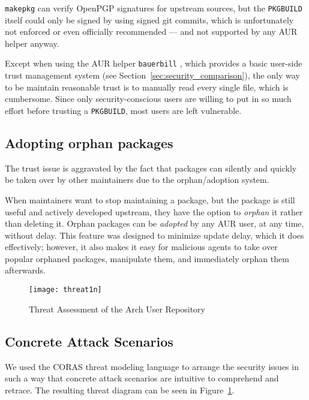 \texttt{makepkg} can verify OpenPGP signatures for upstream sources, but the \texttt{PKGBUILD} itself could only be signed by using signed git commits, which is unfortunately not enforced or even officially recommended --- and not supported by any AUR helper anyway.

Except when using the AUR helper \texttt{bauerbill} \cite{bauerbill}, which provides a basic user-side trust management system (see Section~\ref{sec:security_comparison}), the only way to be maintain reasonable trust is to manually read every single file, which is cumbersome.
Since only security-conscious users are willing to put in so much effort before trusting a \texttt{PKGBUILD}, most users are left vulnerable.

\subsection{Adopting orphan packages}
The trust issue is aggravated by the fact that packages can silently and quickly be taken over by other maintainers due to the orphan/adoption system.

When maintainers want to stop maintaining a package, but the package is still useful and actively developed upstream, they have the option to \emph{orphan} it rather than deleting it.
Orphan packages can be \emph{adopted} by any AUR user, at any time, without delay.
This feature was designed to minimize update delay, which it does effectively; however, it also makes it easy for malicious agents to take over popular orphaned packages, manipulate them, and immediately orphan them afterwards.

\begin{center}
\begin{figure}
	\centering
	\texttt{[image: threat1n]}
	\caption[Threat Assessment]{Threat Assessment of the Arch User Repository}
	\label{fig:threat}
\end{figure}
\end{center}

\subsection{Concrete Attack Scenarios}
\label{sec:attack_scenarios}
We used the CORAS \cite{Dahl:2007} threat modeling language to arrange the security issues in such a way that concrete attack scenarios are intuitive to comprehend and retrace. The resulting threat diagram can be seen in Figure~\ref{fig:threat}.

